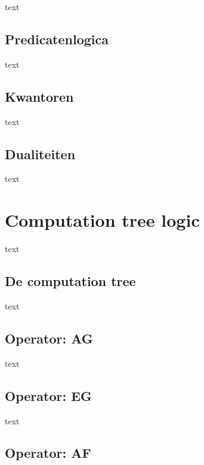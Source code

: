 \documentclass{article}
\begin{document}
		text
		
		\subsection{Predicatenlogica}
		
		text
		
		\subsection{Kwantoren}
		
		text
		
		\subsection{Dualiteiten}
		
		text
	
	\newpage
	
	
	\section{Computation tree logic}
	
	text
		
		\subsection{De computation tree}
				
		text
		
		\subsection{Operator: AG}
				
		text
		
		\subsection{Operator: EG}
				
		text
		
		\subsection{Operator: AF}
				
\end{document}
